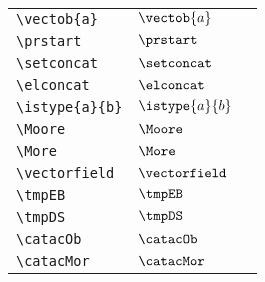 \begin{longtable}{lll}
 {\color[rgb]{0.5,0.5,0.5}\texttt{\textbackslash vectob\{a\}}} & $\vectob{a}$ & \\ 
 {\color[rgb]{0.5,0.5,0.5}\texttt{\textbackslash prstart}} & $\prstart$ & \\ 
 {\color[rgb]{0.5,0.5,0.5}\texttt{\textbackslash setconcat}} & $\setconcat$ & \\ 
 {\color[rgb]{0.5,0.5,0.5}\texttt{\textbackslash elconcat}} & $\elconcat$ & \\ 
 {\color[rgb]{0.5,0.5,0.5}\texttt{\textbackslash istype\{a\}\{b\}}} & $\istype{a}{b}$ & \\ 
 {\color[rgb]{0.5,0.5,0.5}\texttt{\textbackslash Moore}} & $\Moore$ & \\ 
 {\color[rgb]{0.5,0.5,0.5}\texttt{\textbackslash More}} & $\More$ & \\ 
 {\color[rgb]{0.5,0.5,0.5}\texttt{\textbackslash vectorfield}} & $\vectorfield$ & \\ 
 {\color[rgb]{0.5,0.5,0.5}\texttt{\textbackslash tmpEB}} & $\tmpEB$ & \\ 
 {\color[rgb]{0.5,0.5,0.5}\texttt{\textbackslash tmpDS}} & $\tmpDS$ & \\ 
 {\color[rgb]{0.5,0.5,0.5}\texttt{\textbackslash catacOb}} & $\catacOb$ & \\ 
 {\color[rgb]{0.5,0.5,0.5}\texttt{\textbackslash catacMor}} & $\catacMor$ & \\ 
 \end{longtable}
